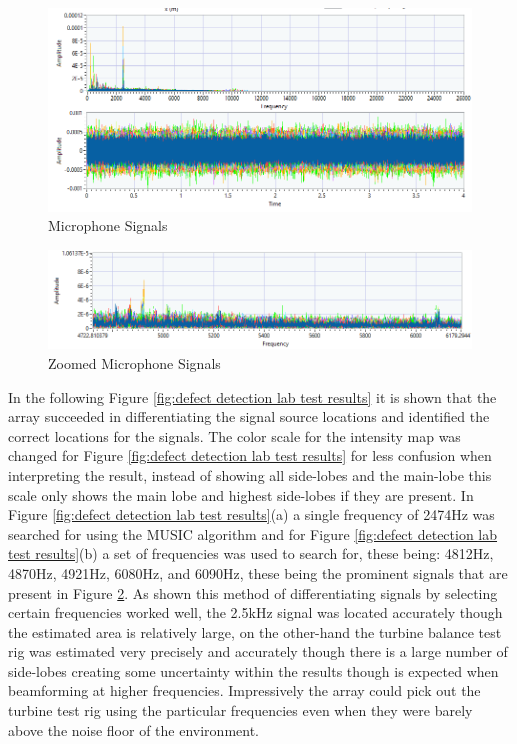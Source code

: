 \documentclass{UoNMCHA}
\numberwithin{equation}{section}
\begin{document}
    \begin{figure} [H]
        \centering
        \includegraphics[keepaspectratio, width = \textwidth]{Figures/Raw Sound Waves.png}
        \caption{Microphone Signals}
        \label{fig:mic signals lab test}
    \end{figure}
    
    \begin{figure} [H]
        \centering
        \includegraphics[keepaspectratio, width = \textwidth]{Figures/Zoomed Sound Waves.png}
        \caption{Zoomed Microphone Signals}
        \label{fig:zoom mic signals lab test}
    \end{figure}
    
    In the following Figure \ref{fig:defect detection lab test results} it is shown that the array succeeded in differentiating the signal source locations and identified the correct locations for the signals. The color scale for the intensity map was changed for Figure \ref{fig:defect detection lab test results} for less confusion when interpreting the result, instead of showing all side-lobes and the main-lobe this scale only shows the main lobe and highest side-lobes if they are present. In Figure \ref{fig:defect detection lab test results}(a) a single frequency of 2474Hz was searched for using the MUSIC algorithm and for Figure \ref{fig:defect detection lab test results}(b) a set of frequencies was used to search for, these being: 4812Hz, 4870Hz, 4921Hz, 6080Hz, and 6090Hz, these being the prominent signals that are present in Figure \ref{fig:zoom mic signals lab test}. As shown this method of differentiating signals by selecting certain frequencies worked well, the 2.5kHz signal was located  accurately though the estimated area is relatively large, on the other-hand the turbine balance test rig was estimated very precisely and accurately though there is a large number of side-lobes creating some uncertainty within the results though is expected when beamforming at higher frequencies. Impressively the array could pick out the turbine test rig using the particular frequencies even when they were barely above the noise floor of the environment.
    
\end{document}
